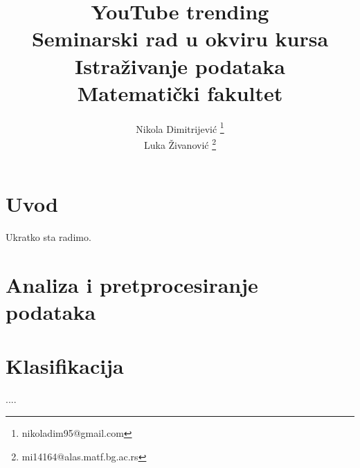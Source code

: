 \documentclass[a4paper]{article}
\theoremstyle{definition}
\begin{document}

\title{YouTube trending\\ \small{Seminarski rad u okviru kursa\\Istraživanje podataka\\ Matematički fakultet}}

\author{Nikola Dimitrijević \footnote{nikoladim95@gmail.com}\\
        Luka Živanović \footnote{mi14164@alas.matf.bg.ac.rs}\\
 }
\vspace*{-3cm}
    {\let\newpage\relax\maketitle}



\tableofcontents

\newpage



\section{Uvod}
\label{sec:uvod}

Ukratko sta radimo.

\section{Analiza i pretprocesiranje podataka}
\label{sec:analiza}


\section{Klasifikacija}
\label{sec:klasifikacija}
....
\end{document}

